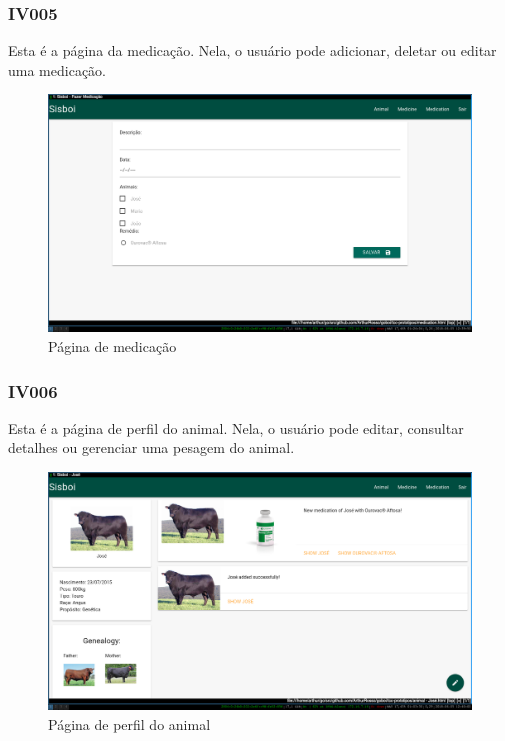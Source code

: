 \documentclass[12pt]{article}
\begin{document}
\newpage
\subsubsection{IV005}

Esta é a página da medicação. Nela, o usuário pode adicionar, deletar ou editar uma medicação.
\begin{figure}[!h]
	\begin{center}
		\caption{Página de medicação}
		\includegraphics[width=13cm]{img/prototipos/medicacao.png}


	\end{center}
\end{figure}

\subsubsection{IV006}

Esta é a página de perfil do animal. Nela, o usuário pode editar, consultar detalhes ou gerenciar uma pesagem do animal.
\begin{figure}[!h]
	\begin{center}
		\caption{Página de perfil do animal}
		\includegraphics[width=13cm]{img/prototipos/perfil.png}


	\end{center}
\end{figure}
\end{document}
